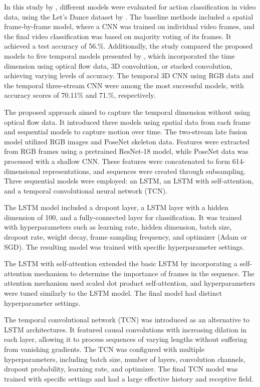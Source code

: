 \documentclass[12pt]{article}
\begin{document}
In this study by \Textcite{bendits}, different models were evaluated for action classification in video data, using the Let's Dance dataset by \Textcite{castro2018let}. The baseline methods included a spatial frame-by-frame model, where a CNN was trained on individual video frames, and the final video classification was based on majority voting of its frames. It achieved a test accuracy of 56.\%. Additionally, the study compared the proposed models to five temporal models presented by \Textcite{castro2018let}, which incorporated the time dimension using optical flow data, 3D convolution, or stacked convolution, achieving varying levels of accuracy. The temporal 3D CNN using RGB data and the temporal three-stream CNN were among the most successful models, with accuracy scores of 70.11\% and 71.\%, respectively.

The proposed approach aimed to capture the temporal dimension without using optical flow data. It introduced three models using spatial data from each frame and sequential models to capture motion over time. The two-stream late fusion model utilized RGB images and PoseNet skeleton data. Features were extracted from RGB frames using a pretrained ResNet-18 model, while PoseNet data was processed with a shallow CNN. These features were concatenated to form 614-dimensional representations, and sequences were created through subsampling. Three sequential models were employed: an LSTM, an LSTM with self-attention, and a temporal convolutional neural network (TCN).

The LSTM model included a dropout layer, a LSTM layer with a hidden dimension of 100, and a fully-connected layer for classification. It was trained with hyperparameters such as learning rate, hidden dimension, batch size, dropout rate, weight decay, frame sampling frequency, and optimizer (Adam or SGD). The resulting model was trained with specific hyperparameter settings.

The LSTM with self-attention extended the basic LSTM by incorporating a self-attention mechanism to determine the importance of frames in the sequence. The attention mechanism used scaled dot product self-attention, and hyperparameters were tuned similarly to the LSTM model. The final model had distinct hyperparameter settings.

The temporal convolutional network (TCN) was introduced as an alternative to LSTM architectures. It featured causal convolutions with increasing dilation in each layer, allowing it to process sequences of varying lengths without suffering from vanishing gradients. The TCN was configured with multiple hyperparameters, including batch size, number of layers, convolution channels, dropout probability, learning rate, and optimizer. The final TCN model was trained with specific settings and had a large effective history and receptive field.
\end{document}
